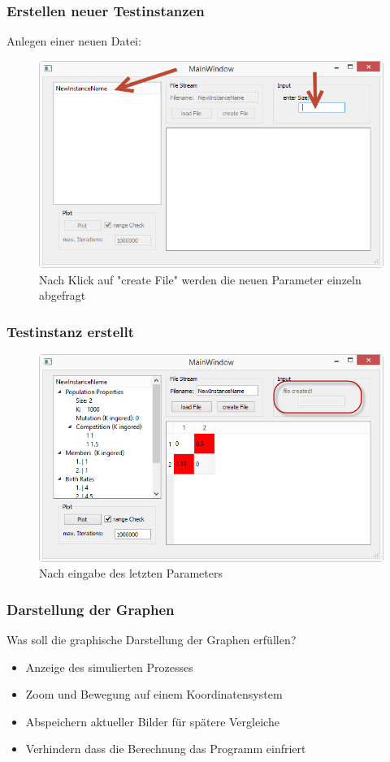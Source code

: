 \documentclass{beamer}
\begin{document}
		\begin{frame}
			\frametitle{Erstellen neuer Testinstanzen}
			Anlegen einer neuen Datei:
			\pause
			\begin{figure}[H]
				\centering
				\includegraphics[width=0.8\linewidth]{./MainWindow_createFile}
				\caption[erstelle Datei]{Nach Klick auf "create File" werden die neuen Parameter einzeln abgefragt}
				\label{fig:MainWindow_createFile}
			\end{figure}
		\end{frame}
		\begin{frame}
			\frametitle{Testinstanz erstellt}
			\begin{figure}[H]
				\centering
				\includegraphics[width=1\linewidth]{./MainWindow_FileCreated}
				\caption[Datei erstellt]{Nach eingabe des letzten Parameters}
				\label{fig:MainWindow_FileCreated}
			\end{figure}
		\end{frame}
		\begin{frame}
			\frametitle{Darstellung der Graphen}
			Was soll die graphische Darstellung der Graphen erfüllen?
			\pause
			\begin{itemize}
				\item Anzeige des simulierten Prozesses
				\pause
				\item Zoom und Bewegung auf einem Koordinatensystem
				\pause
				\item Abspeichern aktueller Bilder für spätere Vergleiche
				\pause
				\item Verhindern dass die Berechnung das Programm einfriert
			\end{itemize}
		\end{frame}
\end{document}
